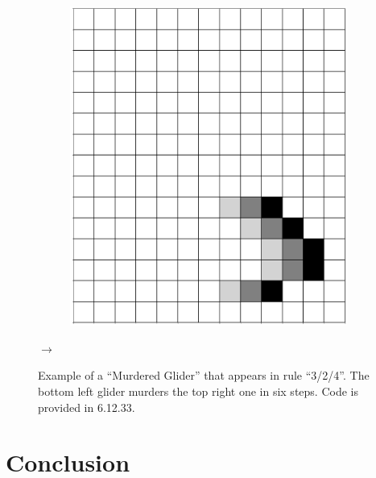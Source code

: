 \documentclass[12pt]{article}
\numberwithin{figure}{section} %
\begin{document}
\begin{figure}[H]
\begin{subfigure}{0.23\textwidth}
     	\subcaption{}
   	\end{subfigure}
	\begin{subfigure}{0.23\textwidth}
     	\includegraphics[width=\linewidth]{Section4/36.6}
     	\subcaption{}
   	\end{subfigure}
	{\LARGE$\rightarrow{}$}
   \caption{Example of a “Murdered Glider” that appears in rule “3/2/4”. The bottom left glider murders the top right one in six steps. Code is provided in 6.12.33.}
   \label{fig:murder glider}
\end{figure}

\newpage
\section{Conclusion}
\end{document}
